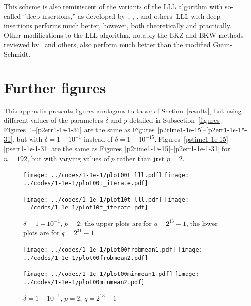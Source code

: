 \documentclass{article}
\begin{document}
This scheme is also reminiscent of the variants of the LLL algorithm
with so-called ``deep insertions,'' as developed
by~\cite{schnorr-euchner}, \cite{fontein-schneider-wagner},
\cite{yasuda-yamaguchi}, and others.
LLL with deep insertions performs much better, however,
both theoretically and practically.
Other modifications to the LLL algorithm,
notably the BKZ and BKW methods reviewed by~\cite{nguyen-vallee} and others,
also perform much better than the modified Gram-Schmidt.



\section{Further figures}
\label{further}

This appendix presents figures analogous to those of Section~\ref{results},
but using different values of the parameters $\delta$ and $p$
detailed in Subsection~\ref{figures}.
Figures~\ref{p2time1-1e-1}--\ref{p2err1-1e-1-31} are the same
as Figures~\ref{p2time1-1e-15}--\ref{p2err1-1e-15-31},
but with $\delta = 1 - 10^{-1}$ instead of $\delta = 1 - 10^{-15}$.
Figures~\ref{pstime1-1e-15}--\ref{pserr1-1e-1-31} are the same
as Figures~\ref{p2time1-1e-15}--\ref{p2err1-1e-1-31} for $n = 192$,
but with varying values of $p$ rather than just $p = 2$.

\begin{figure}
\begin{centering}
{\texttt{[image: ../codes/1-1e-1/plot00t\_lll.pdf]}}
{\texttt{[image: ../codes/1-1e-1/plot00t\_iterate.pdf]}}

{\texttt{[image: ../codes/1-1e-1/plot10t\_lll.pdf]}}
{\texttt{[image: ../codes/1-1e-1/plot10t\_iterate.pdf]}}

\end{centering}
\caption{$\delta = 1-10^{-1}$, $p = 2$;
         the upper plots are for $q = 2^{13} - 1$,
         the lower plots are for $q = 2^{31} - 1$}
\label{p2time1-1e-1}
\end{figure}

\begin{figure}
\begin{centering}
{\texttt{[image: ../codes/1-1e-1/plot00frobmean1.pdf]}}
{\texttt{[image: ../codes/1-1e-1/plot00frobmean2.pdf]}}

{\texttt{[image: ../codes/1-1e-1/plot00minmean1.pdf]}}
{\texttt{[image: ../codes/1-1e-1/plot00minmean2.pdf]}}

\end{centering}
\caption{$\delta = 1-10^{-1}$, $p = 2$, $q = 2^{13} - 1$}
\end{figure}
\end{document}
